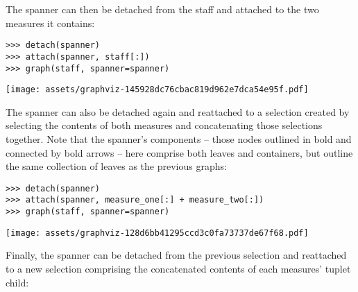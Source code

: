 \noindent The spanner can then be detached from the staff and attached to the
two measures it contains:

\begin{comment}
<abjad>
detach(spanner)
attach(spanner, staff[:])
graph(staff, spanner=spanner)
</abjad>
\end{comment}

\begin{abjadbookoutput}
\begin{singlespacing}
\vspace{-0.5\baselineskip}
\begin{verbatim}
>>> detach(spanner)
>>> attach(spanner, staff[:])
>>> graph(staff, spanner=spanner)
\end{verbatim}
\noindent\texttt{[image: assets/graphviz-145928dc76cbac819d962e7dca54e95f.pdf]}
\end{singlespacing}
\end{abjadbookoutput}

\noindent The spanner can also be detached again and reattached to a selection
created by selecting the contents of both measures and concatenating those
selections together. Note that the spanner's components -- those nodes outlined
in bold and connected by bold arrows -- here comprise both leaves and
containers, but outline the same collection of leaves as the previous graphs:

\begin{comment}
<abjad>
detach(spanner)
attach(spanner, measure_one[:] + measure_two[:])
graph(staff, spanner=spanner)
</abjad>
\end{comment}

\begin{abjadbookoutput}
\begin{singlespacing}
\vspace{-0.5\baselineskip}
\begin{verbatim}
>>> detach(spanner)
>>> attach(spanner, measure_one[:] + measure_two[:])
>>> graph(staff, spanner=spanner)
\end{verbatim}
\noindent\texttt{[image: assets/graphviz-128d6bb41295ccd3c0fa73737de67f68.pdf]}
\end{singlespacing}
\end{abjadbookoutput}

\noindent Finally, the spanner can be detached from the previous selection and
reattached to a new selection comprising the concatenated contents of each
measures' tuplet child:

